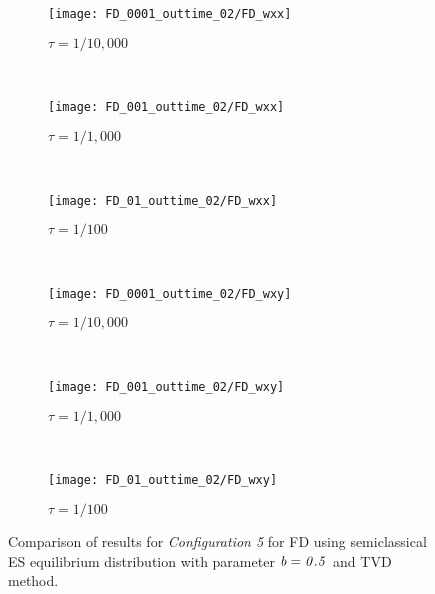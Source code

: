 \documentclass{rsproca}%
\begin{document}
\begin{figure}
        \centering
        \begin{subfigure}[b]{0.32\textwidth}
                \centering
                \texttt{[image: FD\_0001\_outtime\_02/FD\_wxx]}
                \caption{$\tau = 1/10,000$}
                \label{fig:5ESBGK_FD_Wxx_tau0001}
        \end{subfigure}%
        ~ %
        \begin{subfigure}[b]{0.32\textwidth}
                \centering
                \texttt{[image: FD\_001\_outtime\_02/FD\_wxx]}
                \caption{$\tau = 1/1,000$}
                \label{fig:5ESBGK_FD_Wxx_tau001}
        \end{subfigure}
        ~ %
        \begin{subfigure}[b]{0.32\textwidth}
                \centering
                \texttt{[image: FD\_01\_outtime\_02/FD\_wxx]}
                \caption{$\tau = 1/100$}
                \label{fig:5ESBGK_FD_Wxx_tau01}
        \end{subfigure}
				~ %
        \begin{subfigure}[b]{0.32\textwidth}
                \centering
                \texttt{[image: FD\_0001\_outtime\_02/FD\_wxy]}
                \caption{$\tau = 1/10,000$}
                \label{fig:5ESBGK_FD_Wxy_tau0001}
        \end{subfigure}
        ~ %
        \begin{subfigure}[b]{0.32\textwidth}
                \centering
                \texttt{[image: FD\_001\_outtime\_02/FD\_wxy]}
                \caption{$\tau = 1/1,000$}
                \label{fig:5ESBGK_FD_Wxy_tau001}
        \end{subfigure}
				~ %
        \begin{subfigure}[b]{0.32\textwidth}
                \centering
                \texttt{[image: FD\_01\_outtime\_02/FD\_wxy]}
                \caption{$\tau = 1/100$}
                \label{fig:5ESBGK_FD_Wxy_tau01}
        \end{subfigure}
        \caption{Comparison of results for \emph{Configuration 5} for FD using semiclassical ES equilibrium distribution with parameter $\it{b=0.5}$ and TVD method.}
				\label{fig:FD_config5_Wtensor_comparison}
\end{figure}
\end{document}
